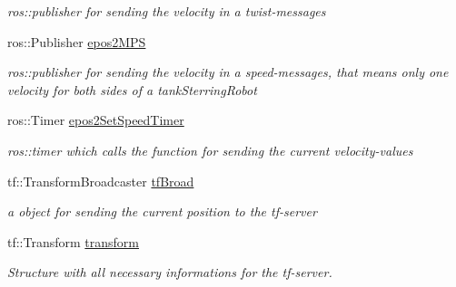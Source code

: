 \begin{DoxyCompactItemize}
\begin{DoxyCompactList}\small\item\em ros\-::publisher for sending the velocity in a twist-\/messages \end{DoxyCompactList}\item 
\hypertarget{structSampleMoving_1_1sampleMovingSettingStruct_a5e6f9645c99c0b227827d8f69e0eaa3f}{ros\-::\-Publisher \hyperlink{structSampleMoving_1_1sampleMovingSettingStruct_a5e6f9645c99c0b227827d8f69e0eaa3f}{epos2\-M\-P\-S}}\label{structSampleMoving_1_1sampleMovingSettingStruct_a5e6f9645c99c0b227827d8f69e0eaa3f}

\begin{DoxyCompactList}\small\item\em ros\-::publisher for sending the velocity in a speed-\/messages, that means only one velocity for both sides of a tank\-Sterring\-Robot \end{DoxyCompactList}\item 
\hypertarget{structSampleMoving_1_1sampleMovingSettingStruct_a240644f39badda2df91ce13a783e29db}{ros\-::\-Timer \hyperlink{structSampleMoving_1_1sampleMovingSettingStruct_a240644f39badda2df91ce13a783e29db}{epos2\-Set\-Speed\-Timer}}\label{structSampleMoving_1_1sampleMovingSettingStruct_a240644f39badda2df91ce13a783e29db}

\begin{DoxyCompactList}\small\item\em ros\-::timer which calls the function for sending the current velocity-\/values \end{DoxyCompactList}\item 
\hypertarget{structSampleMoving_1_1sampleMovingSettingStruct_ab6d337f9b046e91b2921bf4494102796}{tf\-::\-Transform\-Broadcaster \hyperlink{structSampleMoving_1_1sampleMovingSettingStruct_ab6d337f9b046e91b2921bf4494102796}{tf\-Broad}}\label{structSampleMoving_1_1sampleMovingSettingStruct_ab6d337f9b046e91b2921bf4494102796}

\begin{DoxyCompactList}\small\item\em a object for sending the current position to the tf-\/server \end{DoxyCompactList}\item 
\hypertarget{structSampleMoving_1_1sampleMovingSettingStruct_a552f745710950b527f2f202e5ba8a8dc}{tf\-::\-Transform \hyperlink{structSampleMoving_1_1sampleMovingSettingStruct_a552f745710950b527f2f202e5ba8a8dc}{transform}}\label{structSampleMoving_1_1sampleMovingSettingStruct_a552f745710950b527f2f202e5ba8a8dc}

\begin{DoxyCompactList}\small\item\em Structure with all necessary informations for the tf-\/server. \end{DoxyCompactList}\end{DoxyCompactItemize}


